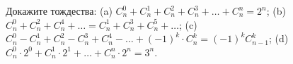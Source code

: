 Докажите тождества: (a) $C_n^0 + C_n^1 + C_n^2 + C_n^3 + \ldots + C_n^n = 2^n$; (b) $C_n^0 + C_n^2 + C_n^4 + \ldots = C_n^1 + C_n^3 + C_n^5 + \ldots$; (c) $C_n^0 - C_n^1 + C_n^2 - C_n^3 + C_n^4 - \ldots + (-1)^k \cdot C_n^k = (-1)^k C_{n-1}^k$; (d) $C_n^0 \cdot 2^0 + C_n^1 \cdot 2^1 + \ldots + C_n^n \cdot 2^n = 3^n$.